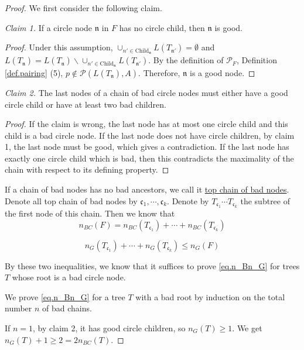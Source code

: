 \begin{proof} We first consider the following claim.
 
\textit{Claim 1.} If a circle node $\mathfrak{n}$ in $F$ has no circle child, then $\mathfrak{n}$ is good.

\begin{proof}
 Under this assumption, $\cup_{n'\in \text{Child}_{\mathfrak{n}}} L(T_{\mathfrak{n}'}) = \emptyset$ and $L(T_{\mathfrak{n}}) = L(T_{\mathfrak{n}})\backslash\cup_{n'\in \text{Child}_{\mathfrak{n}}} L(T_{\mathfrak{n}'})$. By the definition of $\mathcal{P}_F$, Definition \ref{def.pairing} (5), $p\notin\mathcal{P}(L(T_{\mathfrak{n}}), A)$. Therefore, $\mathfrak{n}$ is a good node.
\end{proof}


\textit{Claim 2.} The last nodes of a chain of bad circle nodes must either have a good circle child or have at least two bad children.

\begin{proof}
 If the claim is wrong, the last node has at most one circle child and this child is a bad circle node. If the last node does not have circle children, by claim 1, the last node must be good, which gives a contradiction. If the last node has exactly one circle child which is bad, then this contradicts the maximality of the chain with respect to its defining property.
\end{proof}


If a chain of bad nodes has no bad ancestors, we call it \underline{top chain of bad nodes}. Denote all top chain of bad nodes by $\mathfrak{c}_1, \cdots, \mathfrak{c}_k$. Denote by $T_{\mathfrak{c}_1}\cdots T_{\mathfrak{c}_k}$ the subtree of the first node of this chain. Then we know that 
\begin{equation}
 n_{BC}(F) = n_{BC}(T_{\mathfrak{c}_1}) + \cdots + n_{BC}(T_{\mathfrak{c}_k})
\end{equation}

\begin{equation}
 n_{G}(T_{\mathfrak{c}_1}) + \cdots + n_{G}(T_{\mathfrak{c}_k})\le n_{G}(F)
\end{equation}

By these two inequalities, we know that it suffices to prove \eqref{eq.n_Bn_G} for trees $T$ whose root is a bad circle node.

We prove \eqref{eq.n_Bn_G} for a tree $T$ with a bad root by induction on the total number $n$ of bad chains. 

If $n=1$, by claim 2, it has good circle children, so $n_{G}(T)\ge 1$. We get $n_{G}(T)+1\ge 2 =2n_{BC}(T) $.


\end{proof}
